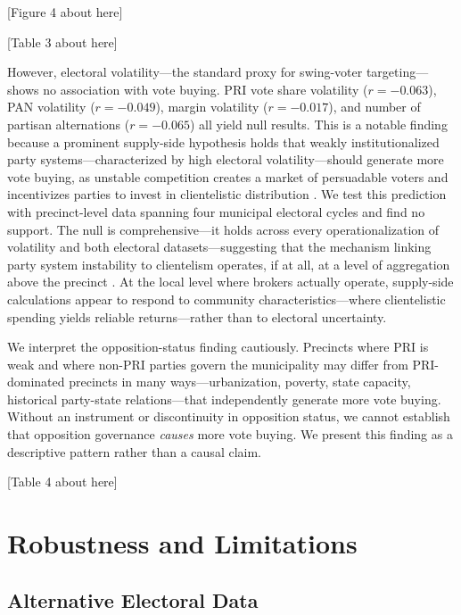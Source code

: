 \documentclass[12pt,letterpaper]{article}
\begin{document}
[Figure 4 about here]

[Table 3 about here]

However, electoral volatility---the standard proxy for swing-voter targeting---shows no association with vote buying. PRI vote share volatility ($r = -0.063$), PAN volatility ($r = -0.049$), margin volatility ($r = -0.017$), and number of partisan alternations ($r = -0.065$) all yield null results. This is a notable finding because a prominent supply-side hypothesis holds that weakly institutionalized party systems---characterized by high electoral volatility---should generate more vote buying, as unstable competition creates a market of persuadable voters and incentivizes parties to invest in clientelistic distribution \citep{kitschelt2007patrons, magaloni2007clientelism}. We test this prediction with precinct-level data spanning four municipal electoral cycles and find no support. The null is comprehensive---it holds across every operationalization of volatility and both electoral datasets---suggesting that the mechanism linking party system instability to clientelism operates, if at all, at a level of aggregation above the precinct \citep[cf.][]{gastev2025volatility}. At the local level where brokers actually operate, supply-side calculations appear to respond to community characteristics---where clientelistic spending yields reliable returns---rather than to electoral uncertainty.

We interpret the opposition-status finding cautiously. Precincts where PRI is weak and where non-PRI parties govern the municipality may differ from PRI-dominated precincts in many ways---urbanization, poverty, state capacity, historical party-state relations---that independently generate more vote buying. Without an instrument or discontinuity in opposition status, we cannot establish that opposition governance \textit{causes} more vote buying. We present this finding as a descriptive pattern rather than a causal claim.

[Table 4 about here]


\section{Robustness and Limitations}

\subsection{Alternative Electoral Data}
\end{document}
